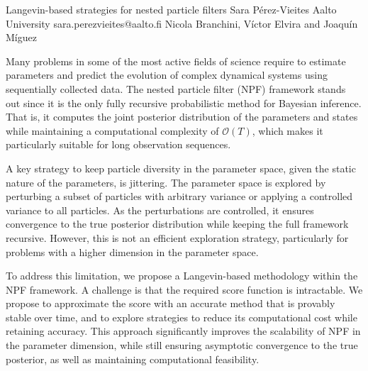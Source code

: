 \begin{talk}
  {Langevin-based strategies for nested particle filters}%
  {Sara P\'erez-Vieites}%
  {Aalto University}%
  {sara.perezvieites@aalto.fi}%
  {Nicola Branchini, V\'ictor Elvira and Joaqu\'in M\'iguez}%
  
    
   
Many problems in some of the most active fields of science require to estimate parameters and predict the evolution of complex dynamical systems using sequentially collected data. The nested particle filter (NPF) framework stands out since it is the only fully recursive probabilistic method for Bayesian inference. That is, it computes the joint posterior distribution of the parameters and states while maintaining a computational complexity of $\mathcal{O}(T)$, which makes it particularly suitable for long observation sequences. 

A key strategy to keep particle diversity in the parameter space, given the static nature of the parameters, is jittering. The parameter space is explored by perturbing a subset of particles with arbitrary variance or applying a controlled variance to all particles. As the perturbations are controlled, it ensures convergence to the true posterior distribution while keeping the full framework recursive. However, this is not an efficient exploration strategy, particularly for problems with a higher dimension in the parameter space.

To address this limitation, we propose a Langevin-based methodology within the NPF framework. A challenge is that the required score function is intractable. We propose to approximate the score with an accurate method that is provably stable over time, and to explore strategies to reduce its computational cost while retaining accuracy.
This approach significantly improves the scalability of NPF in the parameter dimension, while still ensuring asymptotic convergence to the true posterior, as well as maintaining computational feasibility.

\medskip



\end{talk}

